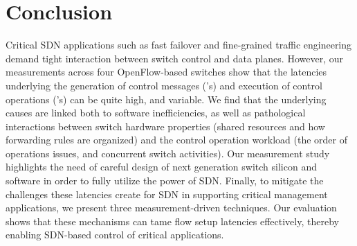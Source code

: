 \section{Conclusion}
\label{sec:conclusion}
Critical SDN applications such as fast failover and fine-grained traffic engineering demand
tight interaction between switch control and data planes. However, our
measurements across four OpenFlow-based switches show that the
latencies underlying the generation of control messages (\packetin's)
and execution of control operations (\flowmod's) can be quite high, and
variable. We find that the underlying causes are linked both to
software inefficiencies, as well as pathological interactions between
switch hardware properties (shared resources and how forwarding rules
are organized) and the control operation workload (the order of
operations issues, and concurrent switch activities). 
Our measurement study highlights the need of careful design of next generation switch silicon 
and software in order to fully utilize the power of SDN.
Finally, to mitigate the
challenges these latencies create for SDN in supporting critical
management applications, we present three measurement-driven techniques.
Our evaluation shows that these mechanisms can tame flow setup
latencies effectively, thereby enabling SDN-based control of critical
applications.


